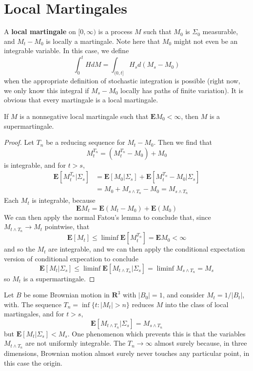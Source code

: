 \section{Local Martingales}

A {\bf local martingale} on $[0,\infty)$ is a process $M$ such that $M_0$ is $\Sigma_0$ measurable, and $M_t - M_0$ is locally a martingale. Note here that $M_0$ might not even be an integrable variable. In this case, we define
%
\[ \int_0^t H dM = \int_{(0,t]} H_s d(M_s - M_0) \]
%
when the appropriate definition of stochastic integration is possible (right now, we only know this integral if $M_s - M_0$ locally has paths of finite variation). It is obvious that every martingale is a local martingale.

\begin{lemma}
    If $M$ is a nonnegative local martingale such that $\mathbf{E} M_0 < \infty$, then $M$ is a supermartingale.
\end{lemma}
\begin{proof}
    Let $T_n$ be a reducing sequence for $M_t - M_0$. Then we find that
    \[ M^{T_n}_t = (M^{T_n}_t - M_0) + M_0 \]
    is integrable, and for $t > s$,
    \begin{align*}
        \mathbf{E}[M^{T_n}_t | \Sigma_s] &= \mathbf{E}[M_0 | \Sigma_s] + \mathbf{E}[ M^{T_n}_t - M_0 | \Sigma_s ]\\
        &= M_0 + M_{s \wedge T_n} - M_0 = M_{s \wedge T_n}
    \end{align*}
    Each $M_t$ is integrable, because
    \[ \mathbf{E}M_t = \mathbf{E}(M_t - M_0) + \mathbf{E}(M_0) \]
    We can then apply the normal Fatou's lemma to conclude that, since $M_{t \wedge T_n} \to M_t$ pointwise, that
    \[ \mathbf{E}[M_t] \leq \liminf \mathbf{E}[M_t^{T_n}] = \mathbf{E}M_0 < \infty \]
    and so the $M_t$ are integrable, and we can then apply the conditional expectation version of conditional expecation to conclude
    \[ \mathbf{E}[M_t | \Sigma_s ] \leq \liminf \mathbf{E}[M_{t \wedge T_n} | \Sigma_s] = \liminf M_{s \wedge T_n} = M_s \]
    so $M_t$ is a supermartingale.
\end{proof}

\begin{example}
    Let $B$ be some Brownian motion in $\mathbf{R}^3$ with $|B_0| = 1$, and consider $M_t = 1/|B_t|$, with. The sequence $T_n = \inf \{ t : |M_t| > n \}$ reduces $M$ into the class of local martingales, and for $t > s$,
    \[ \mathbf{E}[M_{t \wedge T_n} | \Sigma_s] = M_{s \wedge T_n} \]
    but $\mathbf{E}[M_t | \Sigma_s ] < M_s$. One phenomenon which prevents this is that the variables $M_{t \wedge T_n}$ are not uniformly integrable. The $T_n \to \infty$ almost surely because, in three dimensions, Brownian motion almost surely never touches any particular point, in this case the origin.
\end{example}

